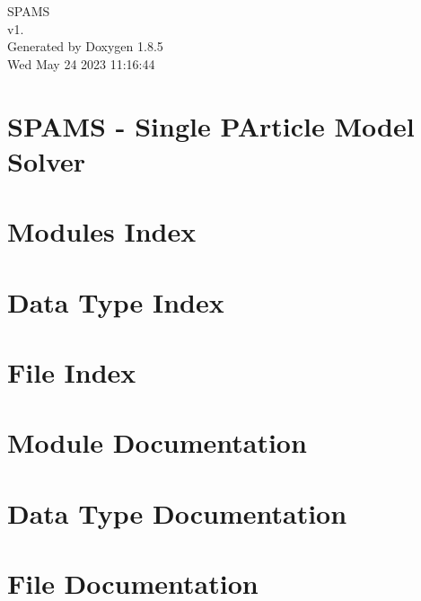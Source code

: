 \documentclass[twoside]{book}
\newcommand{\clearemptydoublepage}{%
  \newpage{\pagestyle{empty}\cleardoublepage}%
}
\begin{document}
\hypersetup{pageanchor=false}
\begin{titlepage}
\vspace*{7cm}
\begin{center}%
{\Large S\-P\-A\-M\-S \\[1ex]\large v1. }\\
\vspace*{1cm}
{\large Generated by Doxygen 1.8.5}\\
\vspace*{0.5cm}
{\small Wed May 24 2023 11:16:44}\\
\end{center}
\end{titlepage}
\clearemptydoublepage
\tableofcontents
\clearemptydoublepage
{}
\hypersetup{pageanchor=true}

\chapter{S\-P\-A\-M\-S -\/ Single P\-Article Model Solver}
\label{md__home_chem_msuvnj__p_x915__group_b_22-23__r_e_a_d_m_e}
\hypertarget{md__home_chem_msuvnj__p_x915__group_b_22-23__r_e_a_d_m_e}{}

\chapter{Modules Index}

\chapter{Data Type Index}

\chapter{File Index}

\chapter{Module Documentation}






\chapter{Data Type Documentation}


\chapter{File Documentation}











\newpage
{}
{}
\printindex
\end{document}
